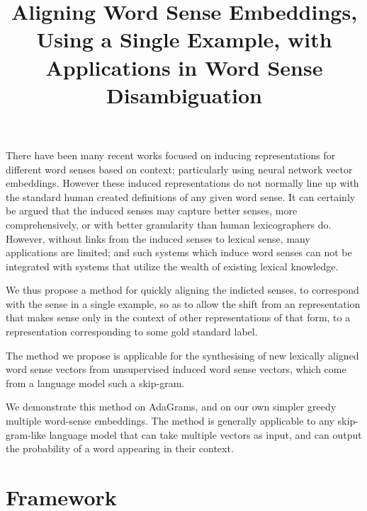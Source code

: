 \documentclass{sig-alternate}
\begin{document}
\title{Aligning Word Sense Embeddings, Using a Single Example, with Applications in Word Sense Disambiguation}
\maketitle


There have been many recent works focused on inducing representations for different word senses based on context; particularly using neural network vector embeddings.
However these induced representations do not normally line up with the standard human created definitions of any given word sense.
It can certainly be argued that the induced senses may capture better senses, more comprehensively, or with better granularity than human lexicographers do.
However, without links from the induced senses to lexical sense, many applications are limited; and such systems which induce word senses can not be integrated with systems that utilize the wealth of existing lexical knowledge.

We thus propose a method for quickly aligning the indicted senses, to correspond with the sense in a single example, so as to allow the shift from an representation that makes sense only in the context of other representations of that form, to a representation corresponding to some gold standard label.

The method we propose is applicable for the synthesising of new lexically aligned word sense vectors from unsupervised induced word sense vectors, which come from a language model such a skip-gram.



We demonstrate this method on AdaGrams\cite{AdaGrams}, and on our own simpler greedy multiple word-sense embeddings. The method is generally applicable to any skip-gram-like language model that can take multiple vectors as input, and can output the probability of a word appearing in their context.

\section{Framework}
\end{document}
